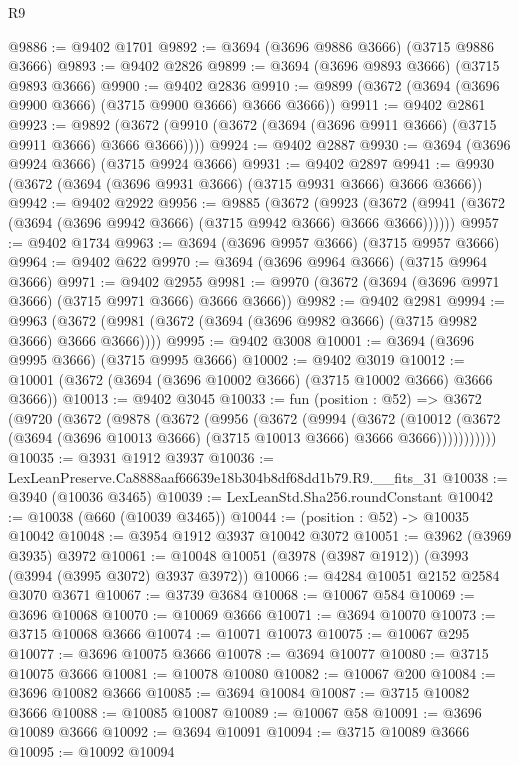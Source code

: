 \begin{lexlean}{R9}
\begin{coremodule}
@9886 := @9402 @1701
@9892 := @3694 (@3696 @9886 @3666) (@3715 @9886 @3666)
@9893 := @9402 @2826
@9899 := @3694 (@3696 @9893 @3666) (@3715 @9893 @3666)
@9900 := @9402 @2836
@9910 := @9899 (@3672 (@3694 (@3696 @9900 @3666) (@3715 @9900 @3666) @3666 @3666))
@9911 := @9402 @2861
@9923 := @9892 (@3672 (@9910 (@3672 (@3694 (@3696 @9911 @3666) (@3715 @9911 @3666) @3666 @3666))))
@9924 := @9402 @2887
@9930 := @3694 (@3696 @9924 @3666) (@3715 @9924 @3666)
@9931 := @9402 @2897
@9941 := @9930 (@3672 (@3694 (@3696 @9931 @3666) (@3715 @9931 @3666) @3666 @3666))
@9942 := @9402 @2922
@9956 := @9885
    (@3672
      (@9923 (@3672 (@9941 (@3672 (@3694 (@3696 @9942 @3666) (@3715 @9942 @3666) @3666 @3666))))))
@9957 := @9402 @1734
@9963 := @3694 (@3696 @9957 @3666) (@3715 @9957 @3666)
@9964 := @9402 @622
@9970 := @3694 (@3696 @9964 @3666) (@3715 @9964 @3666)
@9971 := @9402 @2955
@9981 := @9970 (@3672 (@3694 (@3696 @9971 @3666) (@3715 @9971 @3666) @3666 @3666))
@9982 := @9402 @2981
@9994 := @9963 (@3672 (@9981 (@3672 (@3694 (@3696 @9982 @3666) (@3715 @9982 @3666) @3666 @3666))))
@9995 := @9402 @3008
@10001 := @3694 (@3696 @9995 @3666) (@3715 @9995 @3666)
@10002 := @9402 @3019
@10012 := @10001 (@3672 (@3694 (@3696 @10002 @3666) (@3715 @10002 @3666) @3666 @3666))
@10013 := @9402 @3045
@10033 := fun (position : @52) =>
  @3672
    (@9720
      (@3672
        (@9878
          (@3672
            (@9956
              (@3672
                (@9994
                  (@3672
                    (@10012
                      (@3672 (@3694 (@3696 @10013 @3666) (@3715 @10013 @3666) @3666 @3666)))))))))))
@10035 := @3931 @1912 @3937
@10036 := LexLeanPreserve.Ca8888aaf66639e18b304b8df68dd1b79.R9.__fits_31
@10038 := @3940 (@10036 @3465)
@10039 := LexLeanStd.Sha256.roundConstant
@10042 := @10038 (@660 (@10039 @3465))
@10044 := (position : @52) -> @10035 @10042
@10048 := @3954 @1912 @3937 @10042 @3072
@10051 := @3962 (@3969 @3935) @3972
@10061 := @10048 @10051 (@3978 (@3987 @1912)) (@3993 (@3994 (@3995 @3072) @3937 @3972))
@10066 := @4284 @10051 @2152 @2584 @3070 @3671
@10067 := @3739 @3684
@10068 := @10067 @584
@10069 := @3696 @10068
@10070 := @10069 @3666
@10071 := @3694 @10070
@10073 := @3715 @10068 @3666
@10074 := @10071 @10073
@10075 := @10067 @295
@10077 := @3696 @10075 @3666
@10078 := @3694 @10077
@10080 := @3715 @10075 @3666
@10081 := @10078 @10080
@10082 := @10067 @200
@10084 := @3696 @10082 @3666
@10085 := @3694 @10084
@10087 := @3715 @10082 @3666
@10088 := @10085 @10087
@10089 := @10067 @58
@10091 := @3696 @10089 @3666
@10092 := @3694 @10091
@10094 := @3715 @10089 @3666
@10095 := @10092 @10094

\end{coremodule}
\end{lexlean}
